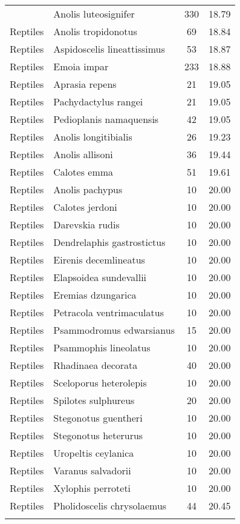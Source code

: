 \begin{longtable}{llcc}
{  Reptiles & Anolis luteosignifer & 330 & 18.79 \\ 
  Reptiles & Anolis tropidonotus &  69 & 18.84 \\ 
  Reptiles & Aspidoscelis lineattissimus &  53 & 18.87 \\ 
  Reptiles & Emoia impar & 233 & 18.88 \\ 
  Reptiles & Aprasia repens &  21 & 19.05 \\ 
  Reptiles & Pachydactylus rangei &  21 & 19.05 \\ 
  Reptiles & Pedioplanis namaquensis &  42 & 19.05 \\ 
  Reptiles & Anolis longitibialis &  26 & 19.23 \\ 
  Reptiles & Anolis allisoni &  36 & 19.44 \\ 
  Reptiles & Calotes emma &  51 & 19.61 \\ 
  Reptiles & Anolis pachypus &  10 & 20.00 \\ 
  Reptiles & Calotes jerdoni &  10 & 20.00 \\ 
  Reptiles & Darevskia rudis &  10 & 20.00 \\ 
  Reptiles & Dendrelaphis gastrostictus &  10 & 20.00 \\ 
  Reptiles & Eirenis decemlineatus &  10 & 20.00 \\ 
  Reptiles & Elapsoidea sundevallii &  10 & 20.00 \\ 
  Reptiles & Eremias dzungarica &  10 & 20.00 \\ 
  Reptiles & Petracola ventrimaculatus &  10 & 20.00 \\ 
  Reptiles & Psammodromus edwarsianus &  15 & 20.00 \\ 
  Reptiles & Psammophis lineolatus &  10 & 20.00 \\ 
  Reptiles & Rhadinaea decorata &  40 & 20.00 \\ 
  Reptiles & Sceloporus heterolepis &  10 & 20.00 \\ 
  Reptiles & Spilotes sulphureus &  20 & 20.00 \\ 
  Reptiles & Stegonotus guentheri &  10 & 20.00 \\ 
  Reptiles & Stegonotus heterurus &  10 & 20.00 \\ 
  Reptiles & Uropeltis ceylanica &  10 & 20.00 \\ 
  Reptiles & Varanus salvadorii &  10 & 20.00 \\ 
  Reptiles & Xylophis perroteti &  10 & 20.00 \\ 
  Reptiles & Pholidoscelis chrysolaemus &  44 & 20.45 \\ 
}
\end{longtable}
